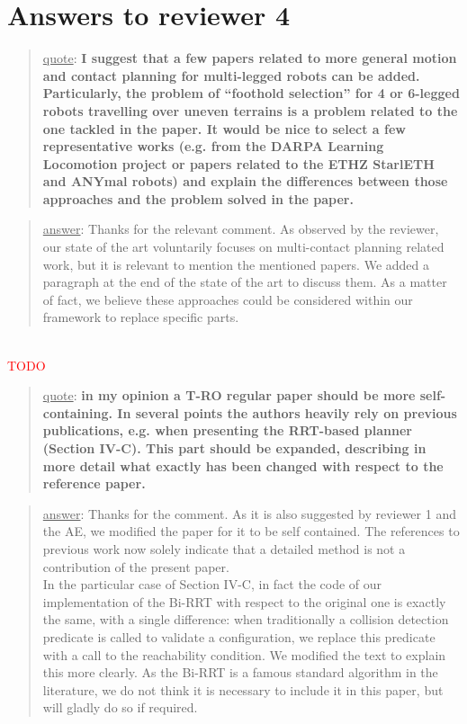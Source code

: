 \documentclass[a4paper]{article}
\newcommand{\ndone}[0]{\textcolor{red}{TODO}}
\newcommand\quot[1]{\begin{quote} \underline{quote}: \textbf{#1}\end{quote}}
\newcommand\as[1]{\begin{quote} \underline{answer}: {#1}\end{quote} \leavevmode \\ }
\begin{document}
\section{Answers to reviewer 4}

\quot{ I suggest that a few papers related to more general motion and contact planning for multi-legged robots can be added. Particularly, the problem of ``foothold selection'' for 4 or 6-legged robots travelling over uneven terrains is a problem related to the one tackled in the paper. It would be nice to select a few representative works (e.g. from the DARPA Learning Locomotion project or
papers related to the ETHZ StarlETH and ANYmal robots) and explain the differences between those approaches and the problem solved in the paper.}
\as{Thanks for the relevant comment. As observed by the reviewer, our state of the art voluntarily focuses on multi-contact planning related work, but it is relevant
to mention the mentioned papers. We added a paragraph at the end of the state of the art to discuss them. As a matter of fact, we believe these approaches could be considered within
our framework to replace specific parts.}\ndone

\quot{in my opinion a T-RO regular paper should be more self-containing. In several points the authors heavily rely on previous publications, e.g. when presenting the RRT-based planner (Section IV-C). This part should be expanded, describing in more detail what exactly has been changed with respect to the reference paper. }
\as{Thanks for the comment. As it is also suggested by reviewer 1 and the AE, we modified the paper for it to be self contained. The references to previous work now solely indicate
that a detailed method is not a contribution of the present paper. \\ 

In the particular case of Section IV-C, in fact the code of our implementation of the Bi-RRT with respect to the original one is exactly the same, with a single difference: when
traditionally a collision detection predicate is called to validate a configuration, we replace this predicate with a call to the reachability condition. We modified the text to explain this more clearly. As the Bi-RRT is a famous standard algorithm in the literature, we do not think it is necessary to include it in this paper, but will gladly do so if required. }
\end{document}
